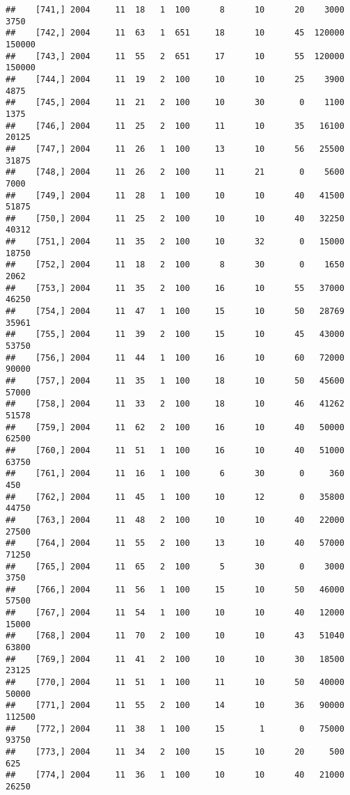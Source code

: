 \documentclass{article}\usepackage[]{graphicx}\usepackage[]{color}
\makeatletter
\newenvironment{kframe}{%
 \def\at@end@of@kframe{}%
 \ifinner\ifhmode%
  \def\at@end@of@kframe{\end{minipage}}%
  \begin{minipage}{\columnwidth}%
 \fi\fi%
 \def\FrameCommand##1{\hskip\@totalleftmargin \hskip-\fboxsep
 \colorbox{shadecolor}{##1}\hskip-\fboxsep
     \hskip-\linewidth \hskip-\@totalleftmargin \hskip\columnwidth}%
 \MakeFramed {\advance\hsize-\width
   \@totalleftmargin\z@ \linewidth\hsize
   \@setminipage}}%
 {\par\unskip\endMakeFramed%
 \at@end@of@kframe}
\newenvironment{knitrout}{}{} %
\makeatother
\begin{document}
\begin{knitrout}
\begin{kframe}
\begin{verbatim}
##    [741,] 2004     11  18   1  100      8      10      20    3000    3750
##    [742,] 2004     11  63   1  651     18      10      45  120000  150000
##    [743,] 2004     11  55   2  651     17      10      55  120000  150000
##    [744,] 2004     11  19   2  100     10      10      25    3900    4875
##    [745,] 2004     11  21   2  100     10      30       0    1100    1375
##    [746,] 2004     11  25   2  100     11      10      35   16100   20125
##    [747,] 2004     11  26   1  100     13      10      56   25500   31875
##    [748,] 2004     11  26   2  100     11      21       0    5600    7000
##    [749,] 2004     11  28   1  100     10      10      40   41500   51875
##    [750,] 2004     11  25   2  100     10      10      40   32250   40312
##    [751,] 2004     11  35   2  100     10      32       0   15000   18750
##    [752,] 2004     11  18   2  100      8      30       0    1650    2062
##    [753,] 2004     11  35   2  100     16      10      55   37000   46250
##    [754,] 2004     11  47   1  100     15      10      50   28769   35961
##    [755,] 2004     11  39   2  100     15      10      45   43000   53750
##    [756,] 2004     11  44   1  100     16      10      60   72000   90000
##    [757,] 2004     11  35   1  100     18      10      50   45600   57000
##    [758,] 2004     11  33   2  100     18      10      46   41262   51578
##    [759,] 2004     11  62   2  100     16      10      40   50000   62500
##    [760,] 2004     11  51   1  100     16      10      40   51000   63750
##    [761,] 2004     11  16   1  100      6      30       0     360     450
##    [762,] 2004     11  45   1  100     10      12       0   35800   44750
##    [763,] 2004     11  48   2  100     10      10      40   22000   27500
##    [764,] 2004     11  55   2  100     13      10      40   57000   71250
##    [765,] 2004     11  65   2  100      5      30       0    3000    3750
##    [766,] 2004     11  56   1  100     15      10      50   46000   57500
##    [767,] 2004     11  54   1  100     10      10      40   12000   15000
##    [768,] 2004     11  70   2  100     10      10      43   51040   63800
##    [769,] 2004     11  41   2  100     10      10      30   18500   23125
##    [770,] 2004     11  51   1  100     11      10      50   40000   50000
##    [771,] 2004     11  55   2  100     14      10      36   90000  112500
##    [772,] 2004     11  38   1  100     15       1       0   75000   93750
##    [773,] 2004     11  34   2  100     15      10      20     500     625
##    [774,] 2004     11  36   1  100     10      10      40   21000   26250

\end{verbatim}
\end{kframe}
\end{knitrout}
\end{document}
